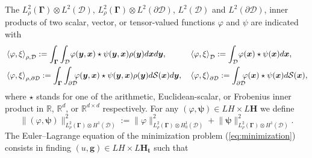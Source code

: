 \documentclass[final,onefignum,onetabnum]{mousaviart}
\begin{document}
	\vspace*{1mm}
	The $L^2_\rho(\boldsymbol{\Gamma}) \otimes L^2(\mathcal{D})$, $L^2_\rho(\boldsymbol{\Gamma}) \otimes L^2(\partial \mathcal{D})$, $L^2(\mathcal{D})$ and $L^2(\partial \mathcal{D})$, inner products of two scalar, vector, or tensor-valued functions $\varphi$ and $\psi$ are indicated with
	\begin{equation*}
		\begin{aligned}
			&\left\langle \varphi, \xi \right\rangle_{\rho, \mathcal{D}} := \int_{\boldsymbol{\Gamma}} \int_{\mathcal{D}} \hspace*{-0.5mm}
			\varphi(\boldsymbol{y}, \boldsymbol{x}) \star \psi (\boldsymbol{y}, \boldsymbol{x}) \rho(\boldsymbol{y})  d\boldsymbol{x}
			 d\boldsymbol{y},
			&&\left\langle \varphi, \xi \right\rangle_{\mathcal{D}} :=  \int_{\mathcal{D}} 
			\hspace*{-0.5mm}
			\varphi (\boldsymbol{x}) \star \psi (\boldsymbol{x})  d\boldsymbol{x},
			\\
			&\left\langle \varphi, \xi \right\rangle_{\rho,\partial \mathcal{D}} := \int_{\boldsymbol{\Gamma}} \int_{\partial \mathcal{D}} \hspace*{-2mm} \varphi (\boldsymbol{y}, \boldsymbol{x}) \star \psi (\boldsymbol{y}, \boldsymbol{x}) \rho(\boldsymbol{y}) d\mathcal{S} (\boldsymbol{x}) d\boldsymbol{y},
			&&
			\left\langle \varphi, \xi \right\rangle_{\partial \mathcal{D}} := \int_{\partial \mathcal{D}} \hspace*{-2mm} \varphi (\boldsymbol{x}) \star \psi (\boldsymbol{x}) d\mathcal{S} (\boldsymbol{x}),
		\end{aligned}
	\end{equation*}
	where $\star$ stands for one of the arithmetic, Euclidean-scalar, or Frobenius inner product in $\mathbb{R}$, $\mathbb{R}^d$, or $\mathbb{R}^{d \times d}$ respectively. 
	For any $(\varphi, \boldsymbol{\psi}) \in LH \times L\boldsymbol{H}$ we define 
	\begin{equation}
		\label{eq:H1-norm}
		\lVert  (\varphi, \boldsymbol{\psi}) \rVert^2_{L^2_\rho(\boldsymbol{\Gamma}) \otimes  H^1(\mathcal{D})} := 
		\lVert  \varphi \rVert^2_{L^2_\rho(\boldsymbol{\Gamma}) \otimes  H^1_0(\mathcal{D})} 
		+
		\lVert  \boldsymbol{\psi} \rVert^2_{L^2_\rho(\boldsymbol{\Gamma}) \otimes  H^1(\mathcal{D})}.
	\end{equation} 
	The Euler–Lagrange equation of the minimization problem (\ref{eq:minimization}) consists in finding $(u, \boldsymbol{g}) \in LH \times L\boldsymbol{H}_{\boldsymbol{t}} $ such that
\end{document}
